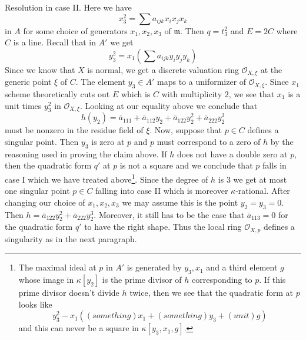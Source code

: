 \documentclass{stacks-project}
\theoremstyle{plain}
\theoremstyle{definition}
\theoremstyle{remark}
\numberwithin{equation}{subsection}
\begin{document}
\medskip\noindent
Resolution in case II. Here we have
$$
x_3^2 = \sum a_{ijk}x_ix_jx_k
$$
in $A$ for some choice of generators $x_1, x_2, x_3$ of $\mathfrak m$.
Then $q = t_3^2$ and $E = 2C$ where $C$ is a line.
Recall that in $A'$ we get
$$
y_3^2 = x_1(\sum a_{ijk} y_iy_jy_k)
$$
Since we know that $X$ is normal, we get a discrete valuation
ring $\mathcal{O}_{X, \xi}$ at the generic point $\xi$ of $C$.
The element $y_3 \in A'$ maps to a uniformizer of $\mathcal{O}_{X, \xi}$.
Since $x_1$ scheme theoretically cuts out $E$
which is $C$ with multiplicity $2$, we see that
$x_1$ is a unit times $y_3^2$ in $\mathcal{O}_{X, \xi}$. Looking
at our equality above we conclude that
$$
h(y_2) = \overline{a}_{111} + \overline{a}_{112} y_2 +
\overline{a}_{122} y_2^2 +
\overline{a}_{222} y_2^3
$$
must be nonzero in the residue field of $\xi$.
Now, suppose that $p \in C$ defines a singular point.
Then $y_3$ is zero at $p$ and $p$ must correspond to a
zero of $h$ by the reasoning used in proving the claim above.
If $h$ does not have a double zero at $p$, then the quadratic
form $q'$ at $p$ is not a square and we conclude that $p$
falls in case I which we have treated above\footnote{The maximal
ideal at $p$ in $A'$ is generated by $y_3, x_1$ and a third element
$g$ whose image in $\kappa[y_2]$ is the prime divisor of $h$
corresponding to $p$. If this prime divisor doesn't divide $h$
twice, then we see that the quadratic form at $p$ looks like
$$
y_3^2 - x_1((something)x_1 + (something)y_3 + (unit)g)
$$
and this can never be a square in $\kappa[y_3, x_1, g]$.}.
Since the degree of $h$ is $3$ we
get at most one singular point $p \in C$ falling into case II
which is moreover $\kappa$-rational. After changing our
choice of $x_1, x_2, x_3$ we may assume this is the point
$y_2 = y_3 = 0$.
Then $h = \overline{a}_{122} y_2^2 + \overline{a}_{222} y_2^3$.
Moreover, it still has to be the case that
$\overline{a}_{113} = 0$ for the quadratic form $q'$ to have
the right shape.
Thus the local ring $\mathcal{O}_{X, p}$ defines a singularity
as in the next paragraph.
\end{document}
